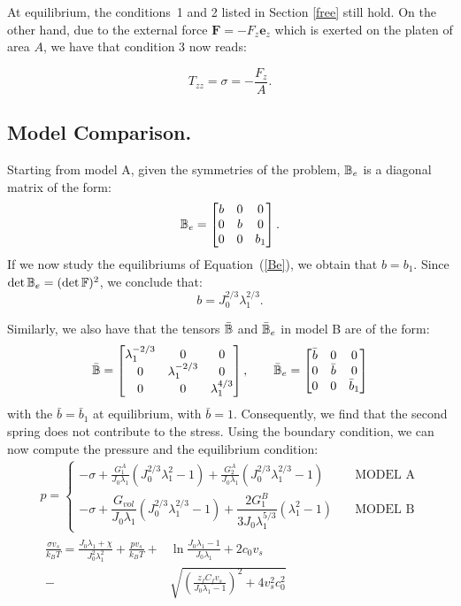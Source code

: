 At equilibrium, the conditions~1 and 2 listed in Section \ref{free} still hold. On the other hand, due to the external force $\mathbf{F}= -F_z \mathbf{e}_z$ which is exerted on the platen of area $A$, we have that condition 3 now reads:

\begin{equation}
T_{zz}=\sigma = -\frac{F_z}{A}.
\end{equation} 

\subsection{Model Comparison.}
Starting from model A, given the symmetries of the problem, $\mathbb{B}_e$ is a diagonal matrix of the form:
\begin{equation}
\mathbb{B}_e=\begin{bmatrix}
b &0&0\\
0&b&0\\
0&0& b_1
\end{bmatrix}. 
\end{equation}
If we now study the equilibriums of Equation~(\ref{Be}), we obtain that $b=b_1$. Since $\det \mathbb{B}_e= (\det \mathbb{F})^2$, we conclude that:
\begin{equation}
b = J_0^{2/3}\lambda_1^{2/3}.
\end{equation}

Similarly, we also have that the tensors $\bar{\mathbb{B}}$ and $\bar{\mathbb{B}}_e$ in model B are of the form:
\begin{equation}
\bar{\mathbb{B}}=\begin{bmatrix}
\lambda_1^{-2/3} &0&0\\
0&\lambda_1^{-2/3}&0\\
0&0& \lambda_1^{4/3}
\end{bmatrix}, \qquad
\bar{\mathbb{B}}_e=\begin{bmatrix}
\bar{b} &0&0\\
0&\bar{b}&0\\
0&0& \bar{b}_1
\end{bmatrix}
\end{equation}
with the $\bar{b}=\bar{b}_1$ at equilibrium, with $\bar{b}=1$. Consequently, we find that the second spring does not contribute to the stress. Using the boundary condition, we can now compute the pressure and the equilibrium condition:
\begin{gather}
p = \begin{cases}
\displaystyle
-\sigma + \frac{G^A_1}{J_0\lambda_1} (J^{2/3}_0\lambda_1^2-1)+\frac{G^A_2}{J_0\lambda_1} (J_0^{2/3} \lambda_1^{2/3}-1) &\quad \text{MODEL A} \\[10pt]
-\sigma + \dfrac{G_{vol}}{J_0\lambda_1}(J_0^{2/3}\lambda_1^{2/3}-1)+\dfrac{2G^B_1}{3J_0\lambda_1^{5/3}} (\lambda_1^2-1) &\quad \text{MODEL B}
\end{cases}\\[10pt]
\begin{aligned}
\frac{\sigma v_s}{k_B T}=\frac{J_0\lambda_1+\chi}{J_0^2\lambda^2_1}+\frac{pv_s}{k_B T}+&\ln \frac{J_0\lambda_1-1}{J_0\lambda_1} +2c_0v_s\\
-\ &\sqrt{\left(\frac{z_fC_fv_s}{J_0\lambda_1-1}\right)^2+4v_s^2c^2_0}
\end{aligned}\label{compA}
\end{gather}

